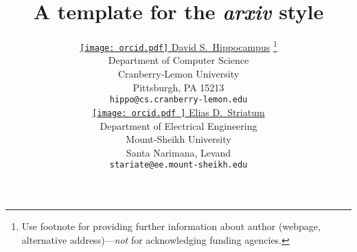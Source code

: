 

\title{A template for the \emph{arxiv} style}


\author{ \href{https://orcid.org/0000-0000-0000-0000}{\texttt{[image: orcid.pdf]}
\hspace{1mm}David S.~Hippocampus}
\thanks{Use footnote for providing further information about author (webpage,
alternative address)---\emph{not} for acknowledging funding agencies.}
\\ Department of Computer Science\\ Cranberry-Lemon University\\ Pittsburgh, PA 15213
\\ \texttt{hippo@cs.cranberry-lemon.edu} \\
\And
\href{https://orcid.org/0000-0000-0000-0000}{\texttt{[image: 
	orcid.pdf
]}
\hspace{1mm}Elias D.~Striatum}
\\ Department of Electrical Engineering\\ Mount-Sheikh University\\ Santa
Narimana, Levand \\ \texttt{stariate@ee.mount-sheikh.edu} \\
}


\renewcommand{\shorttitle}{\textit{arXiv} Template}



